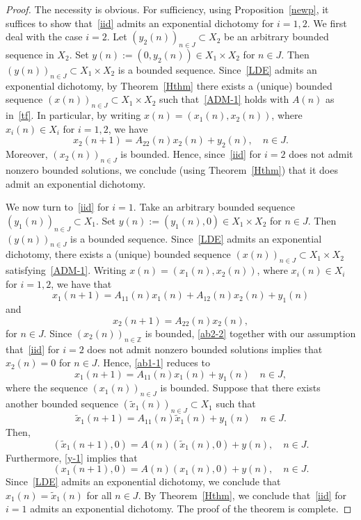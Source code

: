 \documentclass[11pt,reqno,a4paper]{amsart}
\theoremstyle{plain}
\numberwithin{equation}{section}
\theoremstyle{remark}
\def\Z{\mathbb{Z}}
\begin{document}
\begin{proof}
The necessity is obvious.
For sufficiency, 
using Proposition~\ref{newp}, it suffices to show that~\eqref{iid} admits an exponential dichotomy for $i=1,2$. We first deal with the case $i=2$.
Let $(y_2(n))_{n\in J}\subset X_2$ be an arbitrary bounded sequence in $X_2$. Set $y(n):=(0, y_2(n))\in X_1\times X_2$ for $n\in J$. Then $(y(n))_{n\in J}\subset X_1\times X_2$ is a bounded sequence.  Since~\eqref{LDE} admits an exponential dichotomy, by Theorem~\ref{Hthm} there exists a (unique) bounded sequence $(x(n))_{n\in J}\subset X_1\times X_2$ such that~\eqref{ADM-1} holds with $A(n)$ as in~\eqref{tf}. In particular, by
writing $x(n)=(x_1(n), x_2(n))$, where $x_i(n)\in X_i$ for $i=1, 2$,  we have 
\[
x_2(n+1)=A_{22}(n)x_2(n)+y_2(n), \quad n\in J.
\]
Moreover,  $(x_2(n))_{n\in J}$ is bounded. Hence, since~\eqref{iid} for $i=2$ does not admit nonzero bounded solutions, we conclude (using Theorem~\ref{Hthm}) that it does admit an exponential dichotomy.

We now turn to~\eqref{iid} for $i=1$.
Take an arbitrary bounded sequence $(y_1(n))_{n\in J}\subset X_1$. Set $y(n):=(y_1(n), 0)\in X_1\times X_2$ for $n\in J$. Then $(y(n))_{n\in J}$ is a bounded sequence. Since~\eqref{LDE} admits an exponential dichotomy, there exists a (unique) bounded sequence $(x(n))_{n\in J}\subset X_1\times X_2$ satisfying~\eqref{ADM-1}.
Writing $x(n)=(x_1(n), x_2(n))$, where $x_i(n)\in X_i$ for $i=1, 2$, we have that 
\begin{equation}\label{ab1-1}
x_1(n+1)=A_{11}(n)x_1(n)+A_{12}(n)x_2(n)+y_1(n) 
\end{equation}
and
\begin{equation}\label{ab2-2}
x_2(n+1)=A_{22}(n)x_2(n),
    \end{equation}
for $n\in J$. Since $(x_2(n))_{n\in \Z}$ is bounded, \eqref{ab2-2} together with our assumption that~\eqref{iid} for $i=2$ does not admit nonzero bounded solutions implies that $x_2(n)=0$ for $n\in J$. Hence, \eqref{ab1-1} reduces to
\begin{equation}\label{y-1}
x_1(n+1)=A_{11}(n)x_1(n)+y_1(n) \quad n\in J,
\end{equation}
where the sequence $(x_1(n))_{n\in J}$ is bounded. Suppose that there exists another bounded sequence $(\tilde x_1(n))_{n\in J}\subset X_1$ such that 
\[
\tilde x_1(n+1)=A_{11}(n) \tilde x_1(n)+y_1(n) \quad n\in J.
\]
Then,
\[
(\tilde x_1(n+1), 0)=A(n)(\tilde x_1(n), 0)+y(n), \quad n\in J.
\]
Furthermore, \eqref{y-1} implies that 
\[
(x_1(n+1), 0)=A(n)( x_1(n), 0)+y(n), \quad n\in J.
\]
Since~\eqref{LDE} admits an exponential dichotomy, we conclude that $x_1(n)=\tilde x_1(n)$ for all $n\in J$. By Theorem~\ref{Hthm}, we conclude that~\eqref{iid} for $i=1$ admits an exponential dichotomy. The proof of the theorem is complete.
\end{proof}
\end{document}
